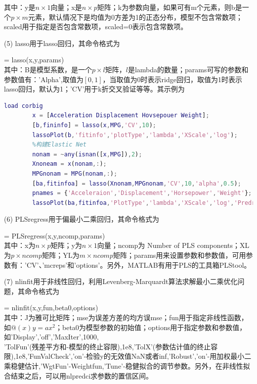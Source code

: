         其中：y是$n\times 1$向量；x是$n\times p$矩阵；k为参数向量，如果可有m个元素，则b是一个$p\times m$元素，默认情况下是均值为0方差为1的正态分布，模型不包含常数项；scaled用于指定是否包含常数项，scaled=0表示包含常数项。
        \par
        (5) lasso用于lasso回归，其命令格式为\par
        [B,FitInfo] = lasso(x,y,params)\\
        其中：B是模型系数，是一个$p\times l$矩阵，$l$是lambda的数量；params可写的参数和参数值有：'Alpha',取值为$[0,1]$，当取值为0时表示ridge回归，取值为1时表示lasso回归，默认为1；'CV'用于k折交叉验证等等。其示例为
        \begin{lstlisting}[language = Matlab]
        load corbig
        x = [Acceleration Displacement Hovsepouer Weight];
        [b,fininfo] = lasso(x,MPG,'CV',10);
        lassoPlot(b,'fitinfo','plotType','lambda','XScale','log');
        %构建Elastic Net
        nonam = ~any(isnan([x,MPG]),2);
        Xnoneam = x(nonam,:);
        MPGnonam = MPG(nonam,:);
        [ba,fitinfoa] = lasso(Xnonam,MPGnonam,'CV',10,'alpha',0.5);
        pnames = {'Acceleraion','Displacement','Horsepower','Weight'};
        lassoPlot(ba,fitinfoa,'PlotType','lambda','XScale','log','PredretorNames','pnames');
        \end{lstlisting}
        \par
        (6) PLSregress用于偏最小二乘回归，其命令格式为\par
        [XL,YL,Xs,Ys,Beta,PctVar,Mse,Stats] = PLSregress(x,y,ncomp,params)\\
        其中：x为$n\times p$矩阵；y为$n\times 1$向量；ncomp为 Number of PLS components；XL为$p\times ncomp$矩阵；YL为$m\times ncomp$矩阵；params用来设置参数和参数值，可用参数有：'CV'、'mcreps'和'options'。另外，MATLAB有用于PLS的工具箱PLStool。
        \par
        (7) nlinfit用于非线性回归，利用Levenberg-Marquardt算法求解最小二乘优化问题，其命令格式为\par
        [beta,r,J,covb,mse] = nlinfit(x,y,fun,beta0,options)\\
        其中：J为雅可比矩阵；mse为误差方差的均方误mse；fun用于指定非线性函数，如$@(x) y=ax^2$；beta0为模型参数的初始值；options用于指定参数和参数值，如'Display','off','MaxIter',1000,\\'TolFun'(残差平方和-模型的终止容限),1e8,'TolX'(参数估计值的终止容限),1e8,'FunValCheck','on'-检验y的无效值NaN或者inf,'Robust','on'-用加权最小二乘稳健估计,'WgtFun'-Weightfun,'Tune'-稳健拟合的调节参数。另外，在非线性拟合结束之后，可以用nlpredci求参数的置信区间。

